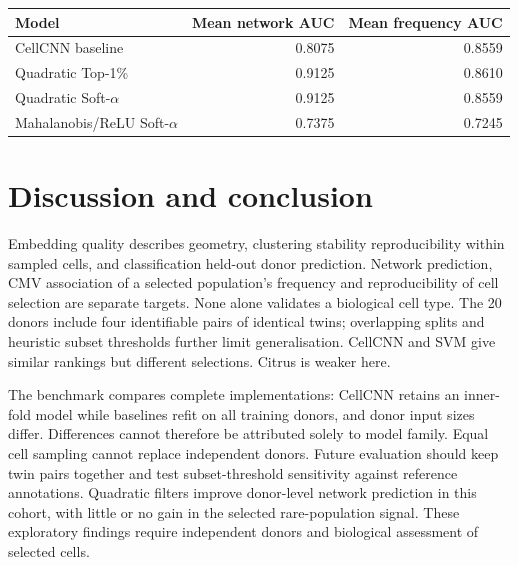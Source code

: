 \documentclass[11pt,a4paper]{article}
\begin{document}
\begin{center}\small
\begin{tabular}{@{}lrr@{}}\toprule
Model & Mean network AUC & Mean frequency AUC\\\midrule
CellCNN baseline & 0.8075 & 0.8559\\
Quadratic Top-1\% & 0.9125 & 0.8610\\
Quadratic Soft-$\alpha$ & 0.9125 & 0.8559\\
Mahalanobis/ReLU Soft-$\alpha$ & 0.7375 & 0.7245\\\bottomrule
\end{tabular}
\end{center}

\section{Discussion and conclusion}
Embedding quality describes geometry, clustering stability reproducibility within sampled cells, and classification held-out donor prediction. Network prediction, CMV association of a selected population's frequency and reproducibility of cell selection are separate targets. None alone validates a biological cell type. The 20 donors include four identifiable pairs of identical twins; overlapping splits and heuristic subset thresholds further limit generalisation. CellCNN and SVM give similar rankings but different selections. Citrus is weaker here.

The benchmark compares complete implementations: CellCNN retains an inner-fold model while baselines refit on all training donors, and donor input sizes differ. Differences cannot therefore be attributed solely to model family. Equal cell sampling cannot replace independent donors. Future evaluation should keep twin pairs together and test subset-threshold sensitivity against reference annotations. Quadratic filters improve donor-level network prediction in this cohort, with little or no gain in the selected rare-population signal. These exploratory findings require independent donors and biological assessment of selected cells.


\end{document}
